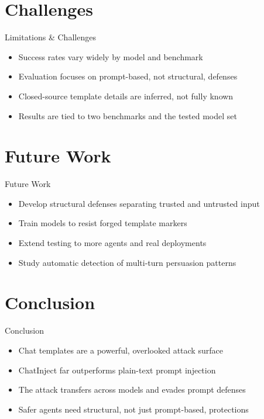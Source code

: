 \documentclass[10pt]{beamer}
\begin{document}
\section{Challenges}
\begin{frame}{Limitations \& Challenges}
\begin{itemize}
  \item Success rates vary widely by model and benchmark
  \item Evaluation focuses on prompt-based, not structural, defenses
  \item Closed-source template details are inferred, not fully known
  \item Results are tied to two benchmarks and the tested model set
\end{itemize}
\end{frame}

\section{Future Work}
\begin{frame}{Future Work}
\begin{itemize}
  \item Develop structural defenses separating trusted and untrusted input
  \item Train models to resist forged template markers
  \item Extend testing to more agents and real deployments
  \item Study automatic detection of multi-turn persuasion patterns
\end{itemize}
\end{frame}

\section{Conclusion}
\begin{frame}{Conclusion}
\begin{itemize}
  \item Chat templates are a powerful, overlooked attack surface
  \item ChatInject far outperforms plain-text prompt injection
  \item The attack transfers across models and evades prompt defenses
  \item Safer agents need structural, not just prompt-based, protections
\end{itemize}
\end{frame}
\end{document}
